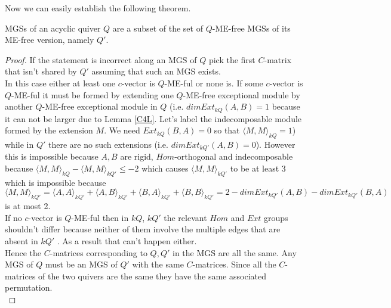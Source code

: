 \indent Now we can easily establish the following theorem.
\begin{theorem}
MGSs of an acyclic quiver $Q$ are a subset of the set of $Q$-ME-free MGSs of its ME-free version, namely $Q'$.\label{C4T1B}
\end{theorem}
\begin{proof}
\indent If the statement is incorrect along an MGS of $Q$ pick the first $C$-matrix that isn't shared by $Q'$ assuming that such an MGS exists. \\
\indent In this case either at least one $c$-vector is $Q$-ME-ful or none is. If some $c$-vector is $Q$-ME-ful it must be formed by extending one $Q$-ME-free exceptional module by another $Q$-ME-free exceptional module in $Q$ (i.e. $dim Ext_{kQ}(A,B) = 1$ because it can not be larger due to Lemma \ref{C4L}. Let's label the indecomposable module formed by the extension $M$. We need $Ext_{kQ}(B,A) = 0$ so that $\langle M,M\rangle_{kQ} = 1$) while in $Q'$  there are no such extensions (i.e. $dim Ext_{kQ'}(A,B) = 0$). However this is impossible because $A, B$ are rigid, $Hom$-orthogonal and indecomposable because $\langle M,M\rangle_{kQ} - \langle M,M\rangle_{kQ'} \leq -2$ which causes $\langle M,M\rangle_{kQ'}$ to be at least 3 which is impossible because $\langle M,M\rangle_{kQ'} = \langle A,A\rangle_{kQ'} + \langle A,B\rangle_{kQ'} + \langle B,A\rangle_{kQ'} + \langle B,B\rangle_{kQ'} = 2 - dim Ext_{kQ'}(A,B) - dim Ext_{kQ'}(B,A)$ is at most 2.\\
\indent If no $c$-vector is $Q$-ME-ful then in $kQ$, $kQ'$ the relevant $Hom$ and $Ext$ groups shouldn't differ because neither of them involve the multiple edges that are absent in $kQ'$ . As a result that can't happen either.\\
\indent Hence the $C$-matrices corresponding to $Q, Q'$ in the MGS are all the same. Any MGS of $Q$ must be an MGS of $Q'$ with the same $C$-matrices. Since all the $C$-matrices of the two quivers are the same they have the same associated permutation.\\
\end{proof}
